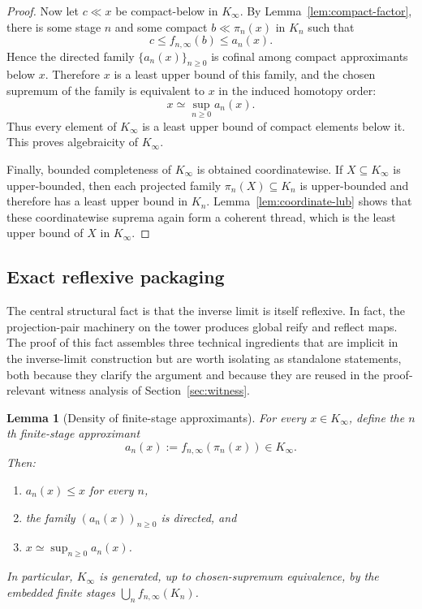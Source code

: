 \documentclass[webpdf,traditional,large,numbered]{oup-authoring-template}
\theoremstyle{thmstyleone}%
\newtheorem{lemma}[theorem]{Lemma}
\theoremstyle{thmstyletwo}%
\theoremstyle{thmstylethree}%
\newcommand{\Kinf}{K_\infty}
\begin{document}
\begin{proof}
  Now let $c\ll x$ be compact-below in $\Kinf$.  By
  Lemma~\ref{lem:compact-factor}, there is some stage $n$ and some compact
  $b\ll \pi_n(x)$ in $K_n$ such that
  \[
    c\le f_{n,\infty}(b)\le a_n(x).
  \]
  Hence the directed family $\{a_n(x)\}_{n\ge 0}$ is cofinal among compact
  approximants below $x$. Therefore $x$ is a least upper bound of this family,
  and the chosen supremum of the family is equivalent to $x$ in the induced
  homotopy order:
  \[
    x \simeq \sup_{n\ge 0} a_n(x).
  \]
  Thus every element of $\Kinf$ is a least upper bound of compact elements below
  it. This proves algebraicity of $\Kinf$.

  Finally, bounded completeness of $\Kinf$ is obtained coordinatewise.  If
  $X\subseteq \Kinf$ is upper-bounded, then each projected family
  $\pi_n(X)\subseteq K_n$ is upper-bounded and therefore has a least upper bound
  in $K_n$.  Lemma~\ref{lem:coordinate-lub} shows that these coordinatewise
  suprema again form a coherent thread, which is the least upper bound of $X$ in
  $\Kinf$.
\end{proof}

\subsection{Exact reflexive packaging}\label{sec:packaging}

The central structural fact is that the inverse limit is itself reflexive.  In
fact, the projection-pair machinery on the tower produces global reify and
reflect maps.  The proof of this fact assembles three technical ingredients that
are implicit in the inverse-limit construction but are worth isolating as
standalone statements, both because they clarify the argument and because they
are reused in the proof-relevant witness analysis of
Section~\ref{sec:witness}.

\begin{lemma}[Density of finite-stage approximants]\label{lem:density}
  For every $x\in\Kinf$, define the \emph{$n$th finite-stage approximant}
  \[
    a_n(x) := f_{n,\infty}(\pi_n(x)) \in \Kinf.
  \]
  Then:
  \begin{enumerate}[label=(\roman*)]
    \item $a_n(x)\le x$ for every $n$,
    \item the family $(a_n(x))_{n\ge 0}$ is directed, and
    \item $x \simeq \sup_{n\ge 0} a_n(x)$.
  \end{enumerate}
  In particular, $\Kinf$ is generated, up to chosen-supremum equivalence, by
  the embedded finite stages $\bigcup_n f_{n,\infty}(K_n)$.
\end{lemma}
\end{document}
